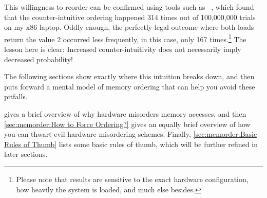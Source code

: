 \begin{listing}[tbp]

\caption{Memory Misordering: Store-Buffering Litmus Test}
\label{lst:memorder:Memory Misordering: Store-Buffering Litmus Test}
\end{listing}

\QuickQuizEnd

This willingness to reorder can be confirmed using tools such as
~\cite{Alglave:2014:HCM:2594291.2594347},
which found that the counter-intuitive ordering happened
314 times out of 100,000,000 trials on my x86 laptop.
Oddly enough, the perfectly legal outcome where both loads return the
value 2 occurred less frequently, in this case, only 167 times.\footnote{
	Please note that results are sensitive to the exact hardware
	configuration,
	how heavily the system is loaded, and much else besides.}
The lesson here is clear: Increased counter-intuitivity does not necessarily
imply decreased probability!

The following sections show exactly where this intuition breaks down,
and then puts forward a mental model of memory ordering that can help
you avoid these pitfalls.

gives a brief overview of why hardware misorders memory accesses, and then
\cref{sec:memorder:How to Force Ordering?}
gives an equally brief overview of how you can thwart evil hardware
misordering schemes.
Finally, \cref{sec:memorder:Basic Rules of Thumb}
lists some basic rules of thumb, which will be further refined in
later sections.

